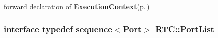 forward declaration of {\bf Execution\-Context}{\rm (p.\,\pageref{interfaceRTC_1_1ExecutionContext})} 

\subsubsection{\setlength{\rightskip}{0pt plus 5cm}interface typedef sequence$<$Port$>$ {\bf RTC::Port\-List}}\label{namespaceRTC_file_a6}


